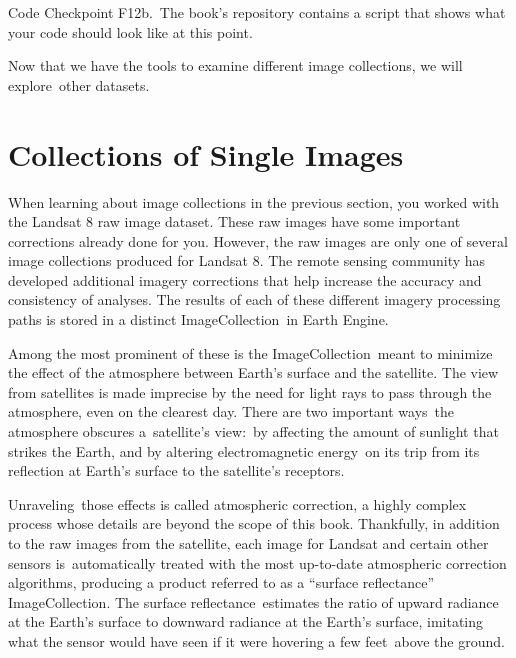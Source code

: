 \documentclass[
  letterpaper,
  DIV=11,
  numbers=noendperiod]{scrreprt}
\begin{document}
\begin{tcolorbox}[enhanced jigsaw, left=2mm, breakable, rightrule=.15mm, opacityback=0, colframe=quarto-callout-note-color-frame, colbacktitle=quarto-callout-note-color!10!white, arc=.35mm, opacitybacktitle=0.6, toptitle=1mm, colback=white, leftrule=.75mm, title=\textcolor{quarto-callout-note-color}{\faInfo}\hspace{0.5em}{Note}, toprule=.15mm, bottomtitle=1mm, titlerule=0mm, bottomrule=.15mm, coltitle=black]

Code Checkpoint F12b.~The book's repository contains a script that shows
what your code should look like at this point.

\end{tcolorbox}

Now that we have the tools to examine different image collections, we
will explore~other datasets.

\hypertarget{collections-of-single-images}{%
\section{Collections of Single
Images}\label{collections-of-single-images}}

When learning about image collections in the previous section, you
worked with the Landsat 8 raw image dataset. These raw images have some
important corrections already done for you. However, the raw images are
only one of several image collections produced for Landsat 8. The remote
sensing community has developed additional imagery corrections that help
increase the accuracy and consistency of analyses. The results of each
of these different imagery processing paths is stored in a distinct
ImageCollection~in Earth Engine.

Among the most prominent of these is the ImageCollection~meant to
minimize the effect of the atmosphere between Earth's surface and the
satellite. The view from satellites is made imprecise by the need for
light rays to pass through the atmosphere, even on the clearest day.
There are two important ways~the atmosphere obscures a~satellite's
view:~by affecting the amount of sunlight that strikes the Earth, and by
altering electromagnetic energy~on its trip from its reflection at
Earth's surface to the satellite's receptors.

Unraveling~those effects is called atmospheric correction, a highly
complex process whose details are beyond the scope of this book.
Thankfully, in addition to the raw images from the satellite, each image
for Landsat and certain other sensors is~automatically treated with the
most up-to-date atmospheric correction algorithms, producing a product
referred to as a ``surface reflectance'' ImageCollection. The surface
reflectance~estimates the ratio of upward radiance at the Earth's
surface to downward radiance at the Earth's surface, imitating what the
sensor would have seen if it were hovering a few feet~above the ground.
~
\end{document}
